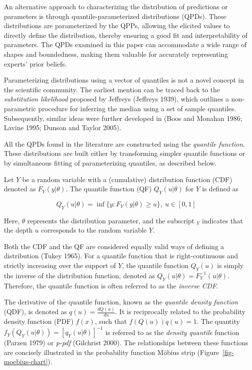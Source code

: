 \documentclass[
]{interact}
\begin{document}
An alternative approach to characterizing the distribution of
predictions or parameters is through quantile-parameterized
distributions (QPDs). These distributions are parameterized by the QPPs,
allowing the elicited values to directly define the distribution,
thereby ensuring a good fit and interpretability of parameters. The QPDs
examined in this paper can accommodate a wide range of shapes and
boundedness, making them valuable for accurately representing experts'
prior beliefs.

Parameterizing distributions using a vector of quantiles is not a novel
concept in the scientific community. The earliest mention can be traced
back to the \emph{substitution likelihood} proposed by Jeffreys
(Jeffreys 1939), which outlines a non-parametric procedure for inferring
the median using a set of sample quantiles. Subsequently, similar ideas
were further developed in (Boos and Monahan 1986; Lavine 1995; Dunson
and Taylor 2005).

All the QPDs found in the literature are constructed using the
\emph{quantile function}. These distributions are built either by
transforming simpler quantile functions or by simultaneous fitting of
parameterizing quantiles, as described below.

Let \(Y\) be a random variable with a (cumulative) distribution function
(CDF) denoted as \(F_Y(y\vert\theta)\). The quantile function (QF)
\(Q_Y(u\vert\theta)\) for \(Y\) is defined as

\[
Q_Y(u\vert\theta)=\inf\{y:F_Y(y\vert\theta)\geq u\}, \; u\in[0,1]
\]

Here, \(\theta\) represents the distribution parameter, and the
subscript \(_Y\) indicates that the depth \(u\) corresponds to the
random variable \(Y\).

Both the CDF and the QF are considered equally valid ways of defining a
distribution (Tukey 1965). For a quantile function that is
right-continuous and strictly increasing over the support of \(Y\), the
quantile function \(Q_Y(u)\) is simply the inverse of the distribution
function, denoted as \(Q_Y(u\vert\theta)=F_Y^{-1}(u\vert\theta)\).
Therefore, the quantile function is often referred to as the
\emph{inverse CDF}.

The derivative of the quantile function, known as the \emph{quantile
density function} (QDF), is denoted as \(q(u) = \frac{dQ(u)}{du}\). It
is reciprocally related to the probability density function (PDF)
\(f(x)\), such that \(f(Q(u))q(u) = 1\). The quantity
\(f_Y(Q_Y(u\vert\theta))=[q_Y(u\vert\theta)]^{-1}\) is referred to as
the \emph{density quantile} function (Parzen 1979) or \emph{p-pdf}
(Gilchrist 2000). The relationships between these functions are
concisely illustrated in the probability function Möbius strip
(Figure~\ref{fig-moebius-chart}).
\end{document}
